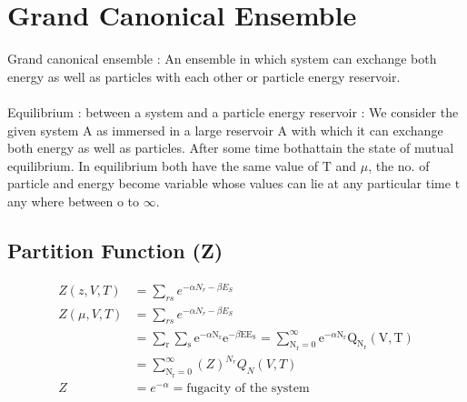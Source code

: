 \section{Grand Canonical Ensemble}
Grand canonical ensemble : An ensemble in which system can exchange both energy as well as particles with each other or particle energy reservoir.\\\\
Equilibrium : between a system and a particle energy reservoir :
We consider the given system A as immersed in a large reservoir A with which it can exchange both energy as well as particles. After some time bothattain the state of mutual equilibrium. In equilibrium both have the same value of $\mathrm{T}$ and $\mu$, the no. of particle and energy become variable whose values can lie at any particular time $\mathrm{t}$ any where between o to $\infty$. 
\subsection{Partition Function (Z)}
\begin{align*}
Z(z, V, T)&=\sum_{r s} e^{-\alpha N_{r}-\beta E_{S}} \\
Z(\mu, V, T)&=\sum_{r s} e^{-\alpha N_{r}-\beta E_{S}}\\
&=\sum_{\mathrm{r}} \sum_{\mathrm{s}} \mathrm{e}^{-\alpha \mathrm{N}_{\mathrm{r}}} \mathrm{e}^{-\beta \mathrm{EE}_{\mathrm{S}}}=\sum_{\mathrm{N}_{\mathrm{r}}=0}^{\infty} \mathrm{e}^{-\alpha \mathrm{N}_{\mathrm{r}}} \mathrm{Q}_{\mathrm{N}_{\mathrm{r}}}(\mathrm{V}, \mathrm{T})\\
&=\sum_{\mathrm{N}_{\mathrm{r}}=0}^{\infty}(Z)^{N_r}Q_N(V,T)\\
Z&=e^{-\alpha}=\text{fugacity of the system }
\end{align*}
